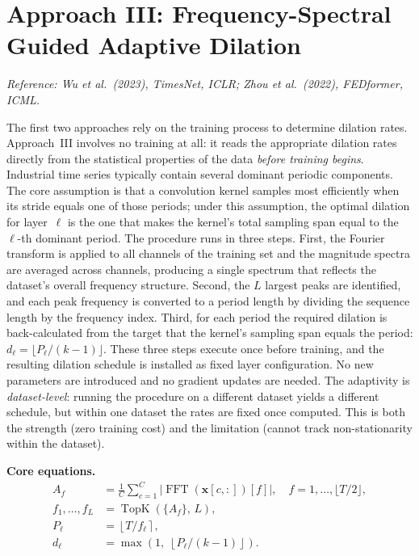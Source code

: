 \documentclass[12pt,a4paper]{article}
\DeclareMathOperator{\FFT}{FFT}
\DeclareMathOperator{\TopK}{TopK}
\newcommand{\xv}{\mathbf{x}}
\begin{document}
\section{Approach III: Frequency-Spectral Guided Adaptive Dilation}

\noindent\textit{Reference: Wu et al.\ (2023), TimesNet, ICLR; Zhou et al.\
(2022), FEDformer, ICML.}

\medskip

The first two approaches rely on the training process to determine dilation
rates. Approach~III involves no training at all: it reads the appropriate dilation
rates directly from the statistical properties of the data \emph{before training
begins}. Industrial time series typically contain several dominant periodic
components. The core assumption is that a convolution kernel samples most
efficiently when its stride equals one of those periods; under this assumption,
the optimal dilation for layer~$\ell$ is the one that makes the kernel's total
sampling span equal to the $\ell$-th dominant period. The procedure runs in
three steps. First, the Fourier transform is applied to all channels of the
training set and the magnitude spectra are averaged across channels, producing
a single spectrum that reflects the dataset's overall frequency structure.
Second, the $L$ largest peaks are identified, and each peak frequency is
converted to a period length by dividing the sequence length by the frequency
index. Third, for each period the required dilation is back-calculated from the
target that the kernel's sampling span equals the period: $d_\ell = \lfloor
P_\ell / (k-1)\rfloor$. These three steps execute once before training, and
the resulting dilation schedule is installed as fixed layer configuration. No
new parameters are introduced and no gradient updates are needed. The
adaptivity is \emph{dataset-level}: running the procedure on a different
dataset yields a different schedule, but within one dataset the rates are fixed
once computed. This is both the strength (zero training cost) and the
limitation (cannot track non-stationarity within the dataset).

\medskip

\noindent\textbf{Core equations.}
\begin{align}
  A_f
    &= \frac{1}{C}\sum_{c=1}^{C}\bigl|\FFT(\xv[c,:])[f]\bigr|,
       \quad f = 1,\ldots,\lfloor T/2\rfloor, \label{eq:fft}\\
  f_1,\ldots,f_L
    &= \TopK\!\left(\{A_f\},\,L\right), \label{eq:topk}\\
  P_\ell
    &= \left\lfloor T/f_\ell \right\rceil, \label{eq:period}\\
  d_\ell
    &= \max\!\left(1,\;\left\lfloor P_\ell/(k-1)\right\rfloor\right).
       \label{eq:freqdil}
\end{align}
\end{document}

